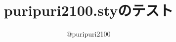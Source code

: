 \documentclass{ltjsarticle}
\begin{document}
\title{\textsf{puripuri2100.sty}のテスト}
\author{@puripuri2100}
\date{\puritoday}
\maketitle

\end{document}
